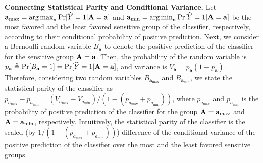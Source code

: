 \noindent\textbf{Connecting Statistical Parity and Conditional Variance.} Let $ \mathbf{a}_{\max} = \operatorname*{arg\,max}_{\mathbf{a}} \Pr[\widehat{Y} = 1 |  \mathbf{A} = \mathbf{a}] $ and $ \mathbf{a}_{\min} = \operatorname*{arg\,min}_{\mathbf{a}} \Pr[\widehat{Y} = 1 | \mathbf{A} = \mathbf{a}] $ be the most favored and the least favored sensitive group of the classifier, respectively, according to their conditional probability of positive prediction. Next, we consider a Bernoulli random variable $ B_{\mathbf{a}} $ to denote the positive prediction of the classifier for the sensitive group $ \mathbf{A} = \mathbf{a} $. Then, the probability of the random variable is $ p_\mathbf{a} \triangleq \Pr[B_{\mathbf{a}} = 1] = \Pr[\widehat{Y} = 1| \mathbf{A} = \mathbf{a}] $, and variance is $ V_{\mathbf{a}} = p_{\mathbf{a}}(1-p_{\mathbf{a}}) $. Therefore, considering two random variables $ B_{\mathbf{a}_{\max}} $ and $ B_{\mathbf{a}_{\min}} $, we state the statistical parity of the classifier as $ p_{a_{\max}} - p_{a_{\min}} = (V_{a_{\max}} - V_{a_{\min}})/(1  - (p_{a_{\max}} + p_{a_{\min}})) $, where $ p_{a_{\max}} $ and $ p_{a_{\min}} $ is the probability of positive prediction of the classifier for the group $ \mathbf{A} = \mathbf{a}_{\max} $ and $ \mathbf{A} = \mathbf{a}_{\min} $, respectively. Intuitively, the statistical parity of the classifier is the scaled (by $ 1/(1  - (p_{a_{\max}} + p_{a_{\min}})) $) difference of the conditional variance of the positive prediction of the classifier over the most and the least favored sensitive groups.


